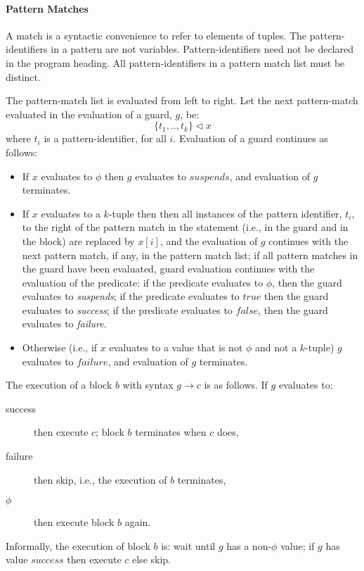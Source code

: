 \paragraph{Pattern Matches}
A match is a syntactic convenience to refer to elements of
tuples.
The pattern-identifiers in a pattern are not variables.
Pattern-identifiers need not be declared in the program heading.
All pattern-identifiers in a pattern match list must be distinct.


The pattern-match list is evaluated from left to right.
Let the next pattern-match evaluated in the evaluation of a guard, $g$, be:
\[ \{t_{1}, .. ,t_{k} \} \lhd x \]
where $t_{i}$ is a pattern-identifier, for all $i$.
Evaluation of a guard continues as follows:
\begin{itemize}
   \item  If $x$ evaluates to $\phi$ then $g$ evaluates to $suspends$, and
   evaluation of $g$ terminates.
   \item  If $x$ evaluates to a $k$-tuple then 
   then all instances of the pattern identifier, $t_{i}$, 
     to the right of the pattern match in the
    statement (i.e., in the guard and in the block) are replaced
    by $x[i]$, and the evaluation of $g$ continues with the next
    pattern match, if any, in the pattern match list; if all pattern matches
    in the guard have been evaluated, guard evaluation continues with
    the evaluation of the predicate:
    if the predicate evaluates to $\phi$, 
    then the guard evaluates to {\em suspends}; 
    if the predicate evaluates to $true$ then the guard evaluates to
    {\em success}; 
    if the predicate evaluates to $false$, then
    the guard evaluates to {\em failure}.
   \item  Otherwise (i.e., if $x$ evaluates to a value that is not 
   $\phi$ and not a $k$-tuple)
   $g$ evaluates to $failure$, and evaluation of $g$ terminates.
\end{itemize}

The execution of a block $b$ with syntax $g \rightarrow c$
is as follows.
If $g$ evaluates to:
\begin{description}
   \item[success] then execute $c$; block $b$ terminates when
   $c$ does,
   \item[failure] then skip, i.e., the execution of $b$ terminates,
   \item[$\phi$] then execute block $b$ again.
\end{description}
Informally, the execution of block $b$ is: wait until $g$ has a non-$\phi$
value; if $g$ has value $success$ then execute $c$ else skip.



